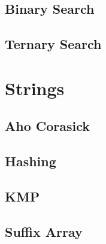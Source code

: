 \documentclass[twocolumn]{article}
\begin{document}
		\subsection{Binary Search}
		\subsection{Ternary Search}
			
	\section{Strings}
		\subsection{Aho Corasick}
		\subsection{Hashing}
		\subsection{KMP}
		\subsection{Suffix Array}
\end{document}

